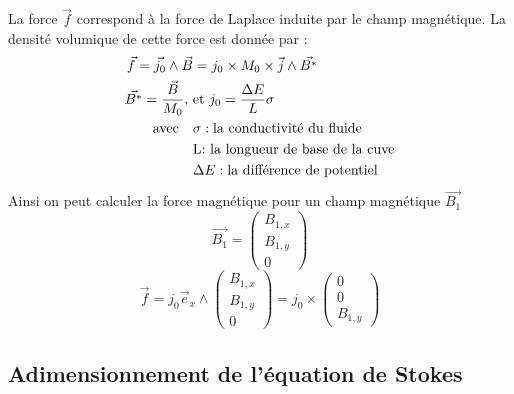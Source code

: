 \documentclass[a4paper,12pt,titlepage]{report}
\begin{document}
\begin{onehalfspace}
La force $\vec{f}$ correspond à la force de Laplace induite par le champ magnétique. La densité volumique de cette force est donnée par :
\[
\begin{aligned}
	\vec{f}=\vec{j_0}\land\vec{B}&=j_0\times M_0\times \vec{j}\wedge \vec{B^*} \\
	 \vec{B^*} =\frac{\vec{B}}{M_0}, 
	\ &\text{et} \ j_0=\frac{\Delta E}{L}\sigma
	\\
\text{avec} \quad
&\sigma : \text{la conductivité du fluide }
\\%
&\text{L: la longueur de base de la cuve} \\
&\Delta E : \text{la différence de potentiel}
\end{aligned} \\
\]
Ainsi on peut calculer la force magnétique pour un champ magnétique $\vec{B_1}$
\[
	\vec{B_1} = 
	\begin{pmatrix}
   		B_{1,x}\\
  		 B _{1,y}\\
  		 0
	\end{pmatrix} 
\]
\[
	\vec{f}=j_0\vec{e}_{x}
	\wedge\begin{pmatrix}
   		B_{1,x}\\
   		B _{1,y}\\
   		0
\end{pmatrix}=
j_0\times \begin{pmatrix}
  			0\\
   			0\\
    		B_{1,y}
			\end{pmatrix} 
\]


\subsection{Adimensionnement de l'équation de Stokes}


\end{onehalfspace}
\end{document}
